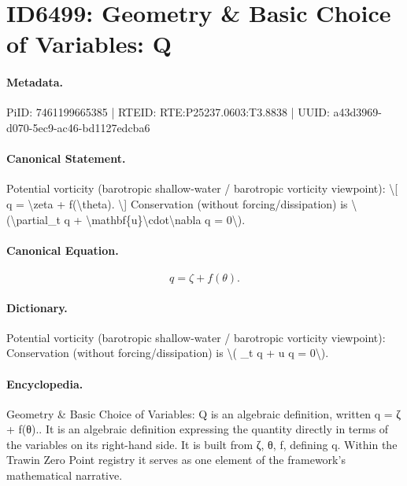 \section*{ID6499: Geometry \& Basic Choice of Variables: Q}
\paragraph{Metadata.}
PiID: 7461199665385 | RTEID: RTE:P25237.0603:T3.8838 | UUID: a43d3969-d070-5ec9-ac46-bd1127edcba6

\paragraph{Canonical Statement.}
Potential vorticity (barotropic shallow-water / barotropic vorticity viewpoint): \textbackslash{}[ q = \textbackslash{}zeta + f(\textbackslash{}theta). \textbackslash{}] Conservation (without forcing/dissipation) is \textbackslash{}(\textbackslash{}partial\_t q + \textbackslash{}mathbf\{u\}\textbackslash{}cdot\textbackslash{}nabla q = 0\textbackslash{}).

\paragraph{Canonical Equation.}
\[
q = \zeta + f(\theta).
\]

\paragraph{Dictionary.}
Potential vorticity (barotropic shallow-water / barotropic vorticity viewpoint): Conservation (without forcing/dissipation) is \textbackslash{}( \_t q + u q = 0\textbackslash{}).

\paragraph{Encyclopedia.}
Geometry \& Basic Choice of Variables: Q is an algebraic definition, written q = ζ + f(θ).. It is an algebraic definition expressing the quantity directly in terms of the variables on its right-hand side. It is built from ζ, θ, f, defining q. Within the Trawin Zero Point registry it serves as one element of the framework's mathematical narrative.
